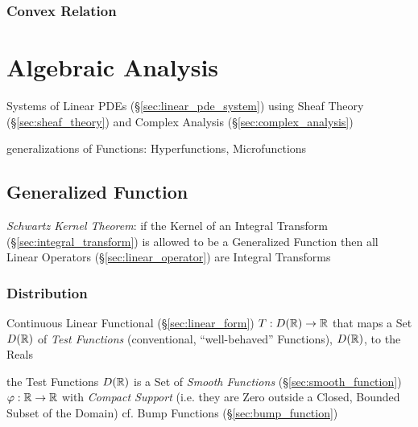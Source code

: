 {\subsubsection{Convex Relation}\label{sec:convex_relation}



\section{Algebraic Analysis}\label{sec:algebraic_analysis}

Systems of Linear PDEs (\S\ref{sec:linear_pde_system}) using Sheaf Theory
(\S\ref{sec:sheaf_theory}) and Complex Analysis (\S\ref{sec:complex_analysis})

generalizations of Functions: Hyperfunctions, Microfunctions



\subsection{Generalized Function}\label{sec:generalized_function}

\emph{Schwartz Kernel Theorem}: if the Kernel of an Integral Transform
(\S\ref{sec:integral_transform}) is allowed to be a Generalized Function then
all Linear Operators (\S\ref{sec:linear_operator}) are Integral Transforms



\subsubsection{Distribution}\label{sec:distribution}

Continuous Linear Functional (\S\ref{sec:linear_form}) $T : D(\mathbb{R}) \to
\mathbb{R}$ that maps a Set $D(\mathbb{R})$ of \emph{Test Functions} (conventional,
``well-behaved'' Functions), $D(\mathbb{R})$, to the Reals

the Test Functions $D(\mathbb{R})$ is a Set of \emph{Smooth Functions}
(\S\ref{sec:smooth_function}) $\varphi : \mathbb{R} \to \mathbb{R}$ with \emph{Compact
  Support} (i.e. they are Zero outside a Closed, Bounded Subset of the Domain)
\fist cf. Bump Functions (\S\ref{sec:bump_function})

}
